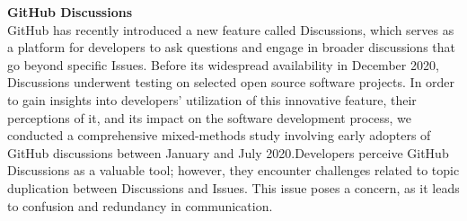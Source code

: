 \textbf{GitHub Discussions}\\
GitHub has recently introduced a new feature called Discussions, which serves as a platform for developers to ask questions and engage in broader discussions that go beyond specific Issues. Before its widespread availability in December 2020, Discussions underwent testing on selected open source software projects. In order to gain insights into developers' utilization of this innovative feature, their perceptions of it, and its impact on the software development process, we conducted a comprehensive mixed-methods study involving early adopters of GitHub discussions between January and July 2020.Developers perceive GitHub Discussions as a valuable tool; however, they encounter challenges related to topic duplication between Discussions and Issues. This issue poses a concern, as it leads to confusion and redundancy in communication.\cite{hata2022github}
